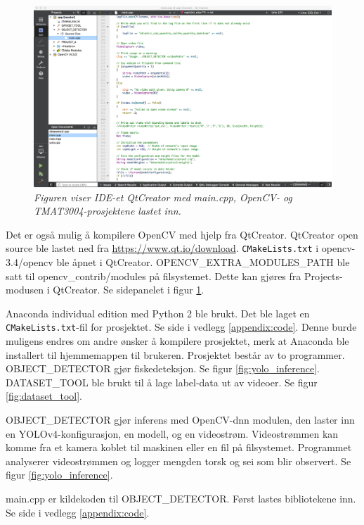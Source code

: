 \begin{figure}
\begin{center} 
\includegraphics[scale=0.2]{figures/qtcreator}
\caption{\small \sl Figuren viser IDE-et QtCreator med main.cpp, OpenCV- og TMAT3004-prosjektene lastet inn. \label{fig:qtcreator}} 
\end{center} 
\end{figure} 

Det er også mulig å kompilere OpenCV med hjelp fra QtCreator. QtCreator open source ble lastet ned fra \url{https://www.qt.io/download}. \texttt{CMakeLists.txt} i opencv-3.4/opencv ble åpnet i QtCreator. OPENCV\_EXTRA\_MODULES\_PATH ble satt til opencv\_contrib/modules på filsystemet. Dette kan gjøres fra Projects-modusen i QtCreator. Se sidepanelet i figur \ref{fig:qtcreator}.

Anaconda individual edition med Python 2 ble brukt. Det ble laget en \texttt{CMakeLists.txt}-fil for prosjektet. Se side \pageref{lst:cmake} i vedlegg \ref{appendix:code}. Denne burde muligens endres om andre ønsker å kompilere prosjektet, merk at Anaconda ble installert til hjemmemappen til brukeren. Prosjektet består av to programmer. OBJECT\_DETECTOR gjør fiskedeteksjon. Se figur \ref{fig:yolo_inference}. DATASET\_TOOL ble brukt til å lage label-data ut av videoer. Se figur \ref{fig:dataset_tool}.

OBJECT\_DETECTOR gjør inferens med OpenCV-dnn modulen, den laster inn en YOLOv4-konfigurasjon, en modell, og en videostrøm. Videostrømmen kan komme fra et kamera koblet til maskinen eller en fil på filsystemet. Programmet analyserer videostrømmen og logger mengden torsk og sei som blir observert. Se figur \ref{fig:yolo_inference}.

main.cpp er kildekoden til OBJECT\_DETECTOR. Først lastes bibliotekene inn. Se side \pageref{lst:header} i vedlegg \ref{appendix:code}.

